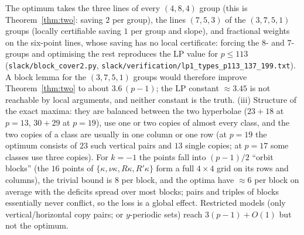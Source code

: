 \documentclass[11pt]{article}
\theoremstyle{remark}
\begin{document}
The optimum takes the three lines of every $(4,8,4)$ group (this is Theorem~\ref{thm:two}: saving $2$ per group), the lines $(7,5,3)$ of
the $(3,7,5,1)$ groups (locally certifiable saving $1$ per group and slope), and fractional weights on the six-point lines, whose saving
has no local certificate: forcing the $8$- and $7$-groups and optimising the rest reproduces the LP value for $p\le113$
(\texttt{slack/block\_cover2.py}, \texttt{slack/verification/lp1\_types\_p113\_137\_199.txt}).  A block lemma for the $(3,7,5,1)$ groups
would therefore improve Theorem~\ref{thm:two} to about $3.6\,(p-1)$; the LP constant $\approx3.45$ is not reachable by local
arguments, and neither constant is the truth.  (iii) Structure of the exact maxima: they are balanced between the two hyperbolae ($23+18$ at $p=13$, $30+29$ at
$p=19$), use one or two copies of almost every class, and the two copies of a class are usually in one column or one row (at $p=19$
the optimum consists of $23$ such vertical pairs and $13$ single copies; at $p=17$ some classes use three copies).  For $k=-1$ the
points fall into $(p-1)/2$ ``orbit blocks'' (the $16$ points of $\{\kappa,\nu\kappa,R\kappa,R'\kappa\}$ form a full $4\times4$ grid on
its rows and columns), the trivial bound is $8$ per block, and the optima have $\approx6$ per block on average with the deficits
spread over most blocks; pairs and triples of blocks essentially never conflict, so the loss is a global effect.  Restricted models
(only vertical/horizontal copy pairs; or $y$-periodic sets) reach $3(p-1)+O(1)$ but not the optimum.  
\end{document}
